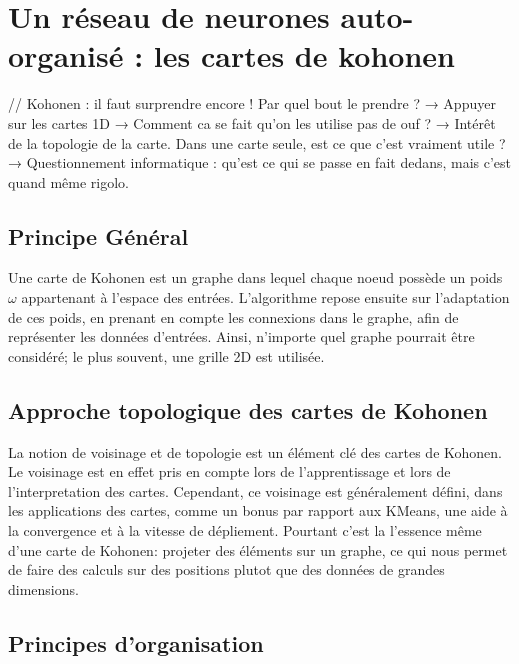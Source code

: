 \chapter{Un réseau de neurones auto-organisé : les cartes de kohonen}
// Kohonen : il faut surprendre encore ! Par quel 
bout le prendre ? 
→ Appuyer sur les cartes 1D
→ Comment ca se fait qu’on les utilise pas de ouf ? 
→  Intérêt de la topologie de la carte. Dans une carte seule, est ce que c’est vraiment utile ?
→ Questionnement informatique : qu’est ce qui se passe en fait dedans, mais c’est quand même rigolo.


\section{Principe Général}
Une carte de Kohonen est un graphe dans lequel chaque noeud possède un poids $\omega$ appartenant à l'espace des entrées. L'algorithme repose ensuite sur l'adaptation de ces poids, en prenant en compte les connexions dans le graphe, afin de représenter les données d'entrées. 
Ainsi, n'importe quel graphe pourrait être considéré; le plus souvent, une grille 2D est utilisée.

\section{Approche topologique des cartes de Kohonen}

La notion de voisinage et de topologie est un élément clé des cartes de Kohonen. Le voisinage est en effet pris en compte lors de l'apprentissage et lors de l'interpretation des cartes. Cependant, ce voisinage est généralement défini, dans les applications des cartes, comme un bonus par rapport aux KMeans, une aide à la convergence et à la vitesse de dépliement. Pourtant c'est la l'essence même d'une carte de Kohonen: projeter des éléments sur un graphe, ce qui nous permet de faire des calculs sur des positions plutot que des données de grandes dimensions. 

\section{Principes d'organisation}